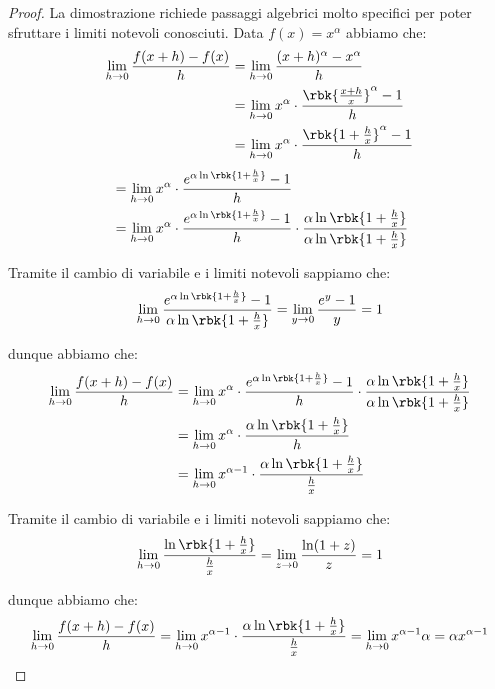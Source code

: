\documentclass[a4paper, 12pt]{report}
\begin{document}
    \begin{proof}
        La dimostrazione richiede passaggi algebrici molto specifici per poter sfruttare i limiti notevoli conosciuti. Data $f(x) = x^\alpha$ abbiamo che:
        \[\begin{split}
            \lim_{h \to 0} \frac{f(x+h)-f(x)}{h} &= \lim_{h \to 0} \frac{(x+h)^\alpha-x^\alpha}{h} \\
            &= \lim_{h \to 0} x^\alpha \cdot \frac{\rbk{\frac{x+h}{x}}^\alpha-1}{h} \\
            &= \lim_{h \to 0} x^\alpha \cdot \frac{\rbk{1+\frac{h}{x}}^\alpha-1}{h} \\
        \end{split}\]
        \[\begin{split}
            &= \lim_{h \to 0} x^\alpha \cdot \frac{e^{\alpha \ln \rbk{1+\frac{h}{x}}}-1}{h} \\
            &= \lim_{h \to 0} x^\alpha \cdot \frac{e^{\alpha \ln \rbk{1+\frac{h}{x}}}-1}{h} \cdot \frac{\alpha \ln \rbk{1+\frac{h}{x}}}{\alpha \ln \rbk{1+\frac{h}{x}}}\\
        \end{split}\]

        Tramite il cambio di variabile e i limiti notevoli sappiamo che:
        \[\lim_{h \to 0} \frac{e^{\alpha \ln \rbk{1+\frac{h}{x}}}-1}{\alpha \ln \rbk{1+\frac{h}{x}}} = \lim_{y \to 0} \frac{e^y-1}{y} = 1\]

        dunque abbiamo che:
        \[\begin{split}
            \lim_{h \to 0} \frac{f(x+h)-f(x)}{h} &= \lim_{h \to 0} x^\alpha \cdot \frac{e^{\alpha \ln \rbk{1+\frac{h}{x}}}-1}{h} \cdot \frac{\alpha \ln \rbk{1+\frac{h}{x}}}{\alpha \ln \rbk{1+\frac{h}{x}}}\\
            &= \lim_{h \to 0} x^\alpha \cdot \frac{\alpha \ln \rbk{1+\frac{h}{x}}}{h}\\
            &= \lim_{h \to 0} x^{\alpha-1} \cdot \frac{\alpha \ln \rbk{1+\frac{h}{x}}}{\frac{h}{x}}\\
        \end{split}\]

        Tramite il cambio di variabile e i limiti notevoli sappiamo che:
        \[\lim_{h \to 0} \frac{\ln \rbk{1+\frac{h}{x}}}{\frac{h}{x}} = \lim_{z \to 0} \frac{\ln(1+z)}{z} = 1\]

        dunque abbiamo che:
        \[\lim_{h \to 0} \frac{f(x+h)-f(x)}{h} = \lim_{h \to 0} x^{\alpha-1} \cdot \frac{\alpha \ln \rbk{1+\frac{h}{x}}}{\frac{h}{x}} = \lim_{h \to 0} x^{\alpha-1}\alpha = \alpha x^{\alpha-1}\]
    \end{proof}
\end{document}
